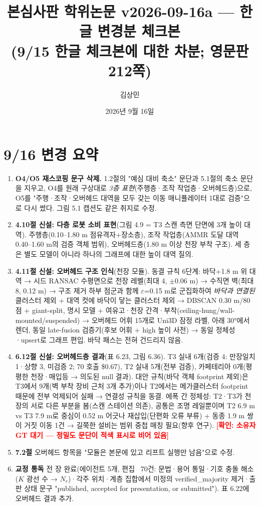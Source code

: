 \documentclass[11pt,a4paper]{article}
\title{\textbf{본심사판 학위논문 v2026-09-16a --- 한글 변경분 체크본}\\[4pt]\large (9/15 한글 체크본에 대한 차분; 영문판 212쪽)}
\author{김상민}\date{2026년 9월 16일}
\newcommand{\chk}[1]{\textcolor{red}{\textbf{[확인: #1]}}}
\begin{document}
\maketitle

\section*{9/16 변경 요약}
\begin{enumerate}[leftmargin=1.5em]
\item \textbf{O4/O5 재스코핑 문구 삭제.} 1.2절의 "예심 대비 축소" 문단과 5.1절의 축소 문단을 지우고, O4를 원래 구상대로 \emph{3층 표현}(주행층·조작 작업층·오버헤드층)으로, O5를 "주행·조작·오버헤드 대역을 모두 갖는 이동 매니퓰레이터 1대로 검증"으로 다시 썼다. 그림 5.1 캡션도 같은 취지로 수정.
\item \textbf{4.10절 신설: 다층 로봇 소비 표현}(그림 4.9 = T3 스캔 측면 단면에 3개 높이 대역). 주행층(0.10--1.80 m 점유격자+장소층), 조작 작업층(AMMR 도달 대역 0.40--1.60 m의 검증 객체 범위), 오버헤드층(1.80 m 이상 천장 부착 구조). 세 층은 별도 모델이 아니라 하나의 그래프에 대한 높이 대역 질의.
\item \textbf{4.11절 신설: 오버헤드 구조 인식}(천장 모듈). 동결 규칙 6단계: 바닥+1.8 m 위 대역 → 시드 RANSAC 수평면으로 천장 레벨(최대 4, $\pm$0.06 m) → 수직면 벽(최대 8, 0.12 m) → 구조 제거 하부 점군과 함께 $\varepsilon$=0.15 m로 군집화하여 \emph{바닥과 연결된} 클러스터 제외 + 대역 컷에 바닥이 닿는 클러스터 제외 → DBSCAN 0.30 m/80점 + giant-split, 명시 모델 + 여유고·천장 간격·부착(ceiling-hung/wall-mounted/suspended) → 오버헤드 어휘 15개로 Uni3D 잠정 라벨, 아래 30°에서 렌더, 동일 late-fusion 검증기(후보 어휘 + high 높이 사전) → 동일 정체성·upsert로 그래프 편입. 바닥 패스는 전혀 건드리지 않음.
\item \textbf{6.12절 신설: 오버헤드층 결과}(표 6.23, 그림 6.36). T3 실내 6개(검증 4: 만장일치 1·상향 3, 미검증 2; 70 호출 \$0.67), T2 실내 5개(전부 검증), 카페테리아 0개(평평한 천장·매입등 → 의도된 null 결과). 대안 규칙(바닥 객체 footprint 제외)은 T3에서 9개(벽 부착 장비 근처 3개 추가)이나 T2에서는 메가클러스터 footprint 때문에 전부 억제되어 실패 → 연결성 규칙을 동결. 에폭 간 정체성: T2·T3가 천장의 서로 다른 부분을 봄(스캔 스테이션 의존), 공통은 조명 레일뿐이며 T2 6.9 m vs T3 7.9 m로 중심이 0.52 m 어긋나 재삽입(단편화 오류 부류) + 동종 1.9 m 쌍이 거짓 이동 1건 → 길쭉한 설비는 범위 중첩 매칭 필요(향후 연구). \chk{소유자 GT 대기 — 정밀도 문단이 적색 표시로 비어 있음}
\item \textbf{7.2절} 오버헤드 항목을 "모듈은 본문에 있고 리프트 실행만 남음"으로 수정.
\item \textbf{교정 통독} 전 장 완료(에이전트 5개, 편집 ~70건: 문법·용어 통일·기호 충돌 해소($K$ 광선 수 → $N_r$)·각주 위치·계층 집합에서 미정의 verified\_majority 제거·출판 상태 문구 "published, accepted for presentation, or submitted"). 표 6.22에 오버헤드 결과 추가.
\end{enumerate}
\end{document}
